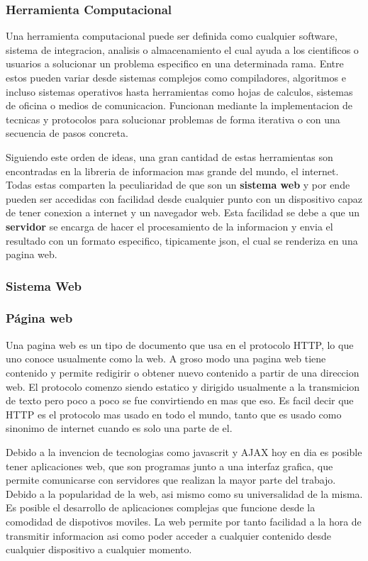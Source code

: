 \subsubsection{Herramienta Computacional}


Una herramienta computacional puede ser definida como cualquier software,
sistema de integracion, analisis o almacenamiento el cual ayuda a los cientificos
o usuarios a solucionar un problema especifico en una determinada rama. Entre
estos pueden variar desde sistemas complejos como compiladores, algoritmos
e incluso sistemas operativos hasta herramientas como hojas de calculos, sistemas
de oficina o medios de comunicacion. Funcionan mediante la implementacion de
tecnicas y protocolos para solucionar problemas de forma iterativa o con una
secuencia de pasos concreta.

Siguiendo este orden de ideas, una gran cantidad de estas herramientas son
encontradas en la libreria de informacion mas grande del mundo, el internet.
Todas estas comparten la peculiaridad de que son un \textbf{sistema web} y por
ende pueden
ser accedidas con facilidad desde cualquier punto con un dispositivo capaz de
tener conexion a internet y un navegador web. Esta facilidad se debe a que un
\textbf{servidor} se encarga de hacer el procesamiento de la informacion y envia
el resultado con un formato especifico, tipicamente json, el cual se renderiza
en una pagina web.

\subsubsection{Sistema Web}


\subsubsection*{Página web}

Una pagina web es un tipo de documento que usa en el protocolo HTTP, lo que uno
conoce usualmente como la web. A groso modo una pagina web tiene contenido y
permite redigirir o obtener nuevo contenido a partir de una direccion web. El
protocolo comenzo siendo estatico y dirigido usualmente a la transmicion de
texto pero poco a poco se fue convirtiendo en mas que eso. Es facil decir que
HTTP es el protocolo mas usado en todo el mundo, tanto que es usado como
sinonimo de internet cuando es solo una parte de el.

Debido a la invencion de tecnologias como javascrit y AJAX hoy en dia es
posible tener aplicaciones web, que son programas junto a una interfaz grafica,
que permite comunicarse con servidores que realizan la mayor parte del trabajo.
Debido a la popularidad de la web, asi mismo como su universalidad de la
misma. Es posible el desarrollo de aplicaciones complejas que funcione desde la
comodidad de dispotivos moviles. La web permite por tanto facilidad a la hora
de transmitir informacion asi como poder acceder a cualquier contenido desde
cualquier dispositivo a cualquier momento.

